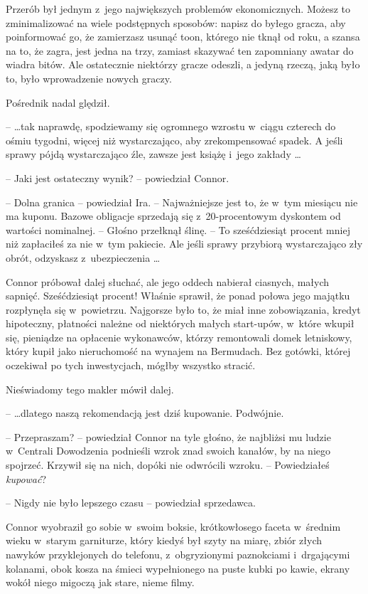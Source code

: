 \documentclass[oneside,polish,11pt,rmheadings]{mwbk}
\begin{document}
Przerób był jednym z~jego największych problemów ekonomicznych. Możesz to zminimalizować na wiele podstępnych sposobów: napisz do byłego gracza, aby poinformować go, że zamierzasz usunąć toon, którego nie tknął od roku, a szansa na to, że zagra, jest jedna na trzy, zamiast skazywać ten zapomniany awatar do wiadra bitów. Ale ostatecznie niektórzy gracze odeszli, a jedyną rzeczą, jaką było to, było wprowadzenie nowych graczy.

Pośrednik nadal ględził.

--  \ldots  tak naprawdę, spodziewamy się ogromnego wzrostu w~ciągu czterech do ośmiu tygodni, więcej niż wystarczająco, aby zrekompensować spadek. A jeśli sprawy pójdą wystarczająco źle, zawsze jest książę i~jego zakłady \ldots 

-- Jaki jest ostateczny wynik? -- powiedział Connor.

-- Dolna granica -- powiedział Ira. -- Najważniejsze jest to, że w~tym miesiącu nie ma kuponu. Bazowe obligacje sprzedają się z~20-procentowym dyskontem od wartości nominalnej. -- Głośno przełknął ślinę. -- To sześćdziesiąt procent mniej niż zapłaciłeś za nie w~tym pakiecie. Ale jeśli sprawy przybiorą wystarczająco zły obrót, odzyskasz z~ubezpieczenia \ldots 

Connor próbował dalej słuchać, ale jego oddech nabierał ciasnych, małych sapnięć. Sześćdziesiąt procent! Właśnie sprawił, że ponad połowa jego majątku rozpłynęła się w~powietrzu. Najgorsze było to, że miał inne zobowiązania, kredyt hipoteczny, płatności należne od niektórych małych start-upów, w~które wkupił się, pieniądze na opłacenie wykonawców, którzy remontowali domek letniskowy, który kupił jako nieruchomość na wynajem na Bermudach. Bez gotówki, której oczekiwał po tych inwestycjach, mógłby wszystko stracić.

Nieświadomy tego makler mówił dalej. 

--  \ldots  dlatego naszą rekomendacją jest dziś kupowanie. Podwójnie. 

-- Przepraszam? -- powiedział Connor na tyle głośno, że najbliżsi mu ludzie w~Centrali Dowodzenia podnieśli wzrok znad swoich kanałów, by na niego spojrzeć. Krzywił się na nich, dopóki nie odwrócili wzroku. -- Powiedziałeś \textit{kupować}?

-- Nigdy nie było lepszego czasu -- powiedział sprzedawca. 

Connor wyobraził go sobie w~swoim boksie, krótkowłosego faceta w~średnim wieku w~starym garniturze, który kiedyś był szyty na miarę, zbiór złych nawyków przyklejonych do telefonu, z~obgryzionymi paznokciami i~drgającymi kolanami, obok kosza na śmieci wypełnionego na puste kubki po kawie, ekrany wokół niego migoczą jak stare, nieme filmy. 
\end{document}
